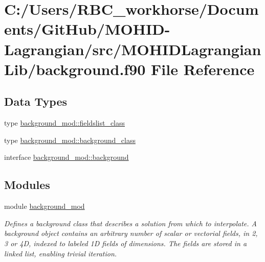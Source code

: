 \hypertarget{background_8f90}{}\section{C\+:/\+Users/\+R\+B\+C\+\_\+workhorse/\+Documents/\+Git\+Hub/\+M\+O\+H\+I\+D-\/\+Lagrangian/src/\+M\+O\+H\+I\+D\+Lagrangian\+Lib/background.f90 File Reference}
\label{background_8f90}
\subsection*{Data Types}
\begin{DoxyCompactItemize}
\item 
type \mbox{\hyperlink{structbackground__mod_1_1fieldslist__class}{background\+\_\+mod\+::fieldslist\+\_\+class}}
\item 
type \mbox{\hyperlink{structbackground__mod_1_1background__class}{background\+\_\+mod\+::background\+\_\+class}}
\item 
interface \mbox{\hyperlink{interfacebackground__mod_1_1background}{background\+\_\+mod\+::background}}
\end{DoxyCompactItemize}
\subsection*{Modules}
\begin{DoxyCompactItemize}
\item 
module \mbox{\hyperlink{namespacebackground__mod}{background\+\_\+mod}}
\begin{DoxyCompactList}\small\item\em Defines a background class that describes a solution from which to interpolate. A background object contains an arbitrary number of scalar or vectorial fields, in 2, 3 or 4D, indexed to labeled 1D fields of dimensions. The fields are stored in a linked list, enabling trivial iteration. \end{DoxyCompactList}\end{DoxyCompactItemize}
